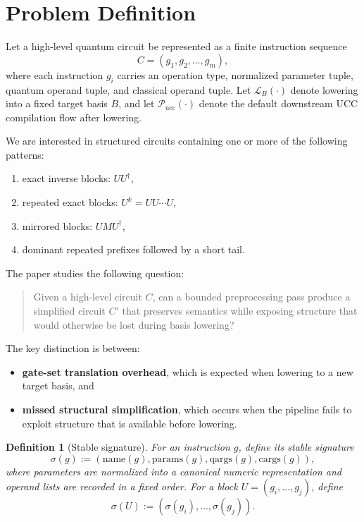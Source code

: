 \documentclass[11pt]{article}
\newtheorem{definition}{Definition}
\begin{document}
\section{Problem Definition}

Let a high-level quantum circuit be represented as a finite instruction sequence
\[
C = (g_1, g_2, \dots, g_m),
\]
where each instruction $g_i$ carries an operation type, normalized parameter tuple, quantum operand tuple, and classical operand tuple. Let $\mathcal{L}_B(\cdot)$ denote lowering into a fixed target basis $B$, and let $\mathcal{P}_{\mathrm{ucc}}(\cdot)$ denote the default downstream UCC compilation flow after lowering.

We are interested in structured circuits containing one or more of the following patterns:
\begin{enumerate}[leftmargin=1.5em]
    \item exact inverse blocks: $U U^\dagger$,
    \item repeated exact blocks: $U^k = U U \cdots U$,
    \item mirrored blocks: $U M U^\dagger$,
    \item dominant repeated prefixes followed by a short tail.
\end{enumerate}

The paper studies the following question:

\begin{quote}
Given a high-level circuit $C$, can a bounded preprocessing pass produce a simplified circuit $C'$ that preserves semantics while exposing structure that would otherwise be lost during basis lowering?
\end{quote}

The key distinction is between:
\begin{itemize}[leftmargin=1.5em]
    \item \textbf{gate-set translation overhead}, which is expected when lowering to a new target basis, and
    \item \textbf{missed structural simplification}, which occurs when the pipeline fails to exploit structure that is available before lowering.
\end{itemize}

\begin{definition}[Stable signature]
For an instruction $g$, define its \emph{stable signature}
\[
\sigma(g) := (\mathrm{name}(g), \mathrm{params}(g), \mathrm{qargs}(g), \mathrm{cargs}(g)),
\]
where parameters are normalized into a canonical numeric representation and operand lists are recorded in a fixed order. For a block $U = (g_i,\dots,g_j)$, define
\[
\sigma(U) := (\sigma(g_i),\dots,\sigma(g_j)).
\]
\end{definition}
\end{document}

